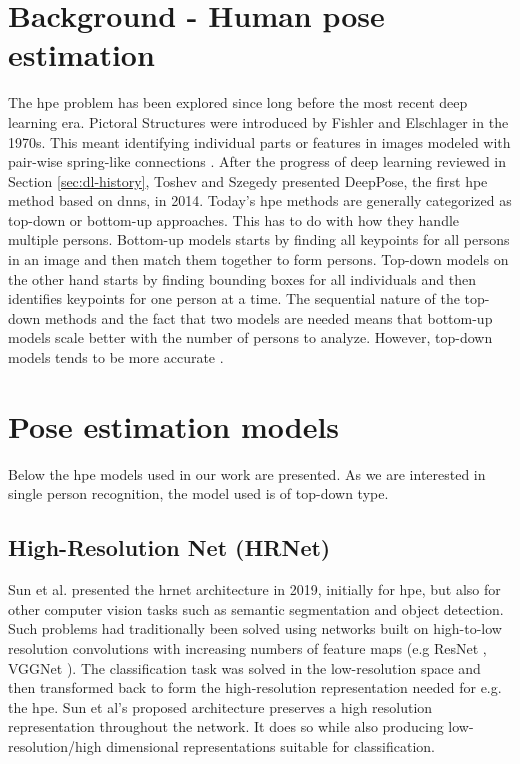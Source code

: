 \section{Background - Human pose estimation}
The \gls{hpe} problem has been explored since long before the most recent deep learning era. Pictoral Structures were introduced by Fishler and Elschlager in the 1970s. This meant identifying individual parts or features in images modeled with pair-wise spring-like connections \cite{Fischler1973}. After the progress of deep learning reviewed in Section \ref{sec:dl-history}, Toshev and Szegedy \cite{Toshev2014} presented DeepPose, the first \gls{hpe} method based on \glspl{dnn}, in 2014. Today's \gls{hpe} methods are generally categorized as top-down or bottom-up approaches. This has to do with how they handle multiple persons. Bottom-up models starts by finding all keypoints for all persons in an image and then match them together to form persons. Top-down models on the other hand starts by finding bounding boxes for all individuals and then identifies keypoints for one person at a time. The sequential nature of the top-down methods and the fact that two models are needed means that bottom-up models scale better with the number of persons to analyze. However, top-down models tends to be more accurate \cite{Cheng2019}.

\section{Pose estimation models}
Below the \gls{hpe} models used in our work are presented. As we are interested in single person recognition, the model used is of top-down type.

\subsection{High-Resolution Net (HRNet)} \label{sec:hrnet}
Sun et al. presented the \gls{hrnet} \cite{Sun2019} architecture in 2019, initially for \gls{hpe}, but also for other computer vision tasks such as semantic segmentation and object detection. Such problems had traditionally been solved using networks built on high-to-low resolution convolutions with increasing numbers of feature maps (e.g ResNet \cite{He2016}, VGGNet \cite{Simonyan2015}). The classification task was solved in the low-resolution space and then transformed back to form the high-resolution representation needed for e.g. the \gls{hpe}. Sun et al's proposed architecture preserves a high resolution representation throughout the network. It does so while also producing low-resolution/high dimensional representations suitable for classification.

